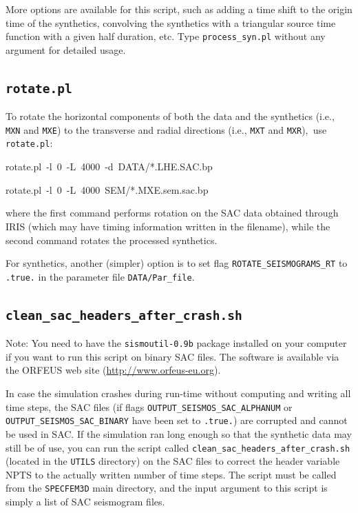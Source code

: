 \documentclass[oneside,english]{book}
\newenvironment{lyxcode}
{\begin{list}{}{
\setlength{\rightmargin}{\leftmargin}
\setlength{\listparindent}{0pt}%
\raggedright
\setlength{\itemsep}{0pt}
\setlength{\parsep}{0pt}
\normalfont\ttfamily}%
 \item[]}
{\end{list}}
\newcommand{\urlwithparentheses}[1]{(\url{#1})}
\begin{document}
More options are available for this script, such as adding a time shift
to the origin time of the synthetics, convolving the synthetics with
a triangular source time function with a given half duration, etc.
Type \texttt{process\_syn.pl} without any argument for detailed
usage.


\subsection{\texttt{rotate.pl}}

To rotate the horizontal components of both the data and the synthetics
(i.e., \texttt{MXN} and \texttt{MXE}) to the transverse and radial directions (i.e., \texttt{MXT} and \texttt{MXR}),\texttt{\small{}
}use{\small{} }\texttt{\small rotate.pl}:

\begin{lyxcode}
rotate.pl~-l~0~-L~4000~-d~DATA/{*}.LHE.SAC.bp~

rotate.pl~-l~0~-L~4000~SEM/{*}.MXE.sem.sac.bp~
\end{lyxcode}
where the first command performs rotation on the SAC data obtained
through IRIS (which may have timing information written in the filename),
while the second command rotates the processed synthetics.

For synthetics, another (simpler) option is to set flag \texttt{ROTATE\_SEISMOGRAMS\_RT}
to \texttt{.true.} in the parameter file \texttt{DATA/Par\_file}.


\subsection{\texttt{clean\_sac\_headers\_after\_crash.sh}}

Note: You need to have the \texttt{sismoutil-0.9b} package installed
on your computer if you want to run this script on binary SAC files.
The software is available via the ORFEUS web site \urlwithparentheses{http://www.orfeus-eu.org}.

In case the simulation crashes during run-time without computing and
writing all time steps, the SAC files (if flags \texttt{OUTPUT\_SEISMOS\_SAC\_ALPHANUM}
or \texttt{OUTPUT\_SEISMOS\_SAC\_BINARY} have been set to \texttt{.true.})
are corrupted and cannot be used in SAC. If the simulation
ran long enough so that the synthetic data may still be of use, you
can run the script called \texttt{clean\_sac\_headers\_after\_crash.sh}
(located in the \texttt{UTILS} directory) on the SAC files to correct
the header variable NPTS to the actually written number of time steps.
The script must be called from the \texttt{SPECFEM3D} main directory,
and the input argument to this script is simply a list of SAC seismogram
files.
\end{document}
